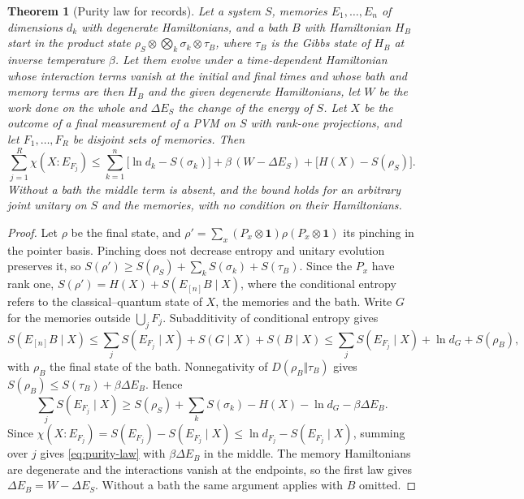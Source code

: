 \documentclass[12pt,a4paper]{article}
\newtheorem{theorem}{Theorem}[section]
\begin{document}
\begin{theorem}[Purity law for records]
\label{thm:purity}
Let a system $S$, memories $E_1,\dots,E_n$ of dimensions $d_k$ with degenerate Hamiltonians, and a bath $B$ with Hamiltonian $H_B$ start in the product state $\rho_S\otimes\bigotimes_k\sigma_k\otimes\tau_B$, where $\tau_B$ is the Gibbs state of $H_B$ at inverse temperature $\beta$. Let them evolve under a time-dependent Hamiltonian whose interaction terms vanish at the initial and final times and whose bath and memory terms are then $H_B$ and the given degenerate Hamiltonians, let $W$ be the work done on the whole and $\Delta E_S$ the change of the energy of $S$. Let $X$ be the outcome of a final measurement of a PVM on $S$ with rank-one projections, and let $F_1,\dots,F_R$ be disjoint sets of memories. Then
\begin{equation}
\sum_{j=1}^R\chi(X:E_{F_j})\le\sum_{k=1}^n\bigl[\ln d_k-S(\sigma_k)\bigr]+\beta\,(W-\Delta E_S)+\bigl[H(X)-S(\rho_S)\bigr].
\label{eq:purity-law}
\end{equation}
Without a bath the middle term is absent, and the bound holds for an arbitrary joint unitary on $S$ and the memories, with no condition on their Hamiltonians.
\end{theorem}

\begin{proof}
Let $\rho$ be the final state, and $\rho'=\sum_x(P_x\otimes\mathbf 1)\rho(P_x\otimes\mathbf 1)$ its pinching in the pointer basis. Pinching does not decrease entropy and unitary evolution preserves it, so $S(\rho')\ge S(\rho_S)+\sum_kS(\sigma_k)+S(\tau_B)$. Since the $P_x$ have rank one, $S(\rho')=H(X)+S(E_{[n]}B\mid X)$, where the conditional entropy refers to the classical--quantum state of $X$, the memories and the bath. Write $G$ for the memories outside $\bigcup_jF_j$. Subadditivity of conditional entropy gives
\[
S(E_{[n]}B\mid X)\le\sum_jS(E_{F_j}\mid X)+S(G\mid X)+S(B\mid X)\le\sum_jS(E_{F_j}\mid X)+\ln d_G+S(\rho_{B}),
\]
with $\rho_B$ the final state of the bath. Nonnegativity of $D(\rho_B\Vert\tau_B)$ gives $S(\rho_B)\le S(\tau_B)+\beta\Delta E_B$. Hence
\[
\sum_jS(E_{F_j}\mid X)\ge S(\rho_S)+\sum_kS(\sigma_k)-H(X)-\ln d_G-\beta\Delta E_B .
\]
Since $\chi(X:E_{F_j})=S(E_{F_j})-S(E_{F_j}\mid X)\le\ln d_{F_j}-S(E_{F_j}\mid X)$, summing over $j$ gives \eqref{eq:purity-law} with $\beta\Delta E_B$ in the middle. The memory Hamiltonians are degenerate and the interactions vanish at the endpoints, so the first law gives $\Delta E_B=W-\Delta E_S$. Without a bath the same argument applies with $B$ omitted.
\end{proof}
\end{document}
